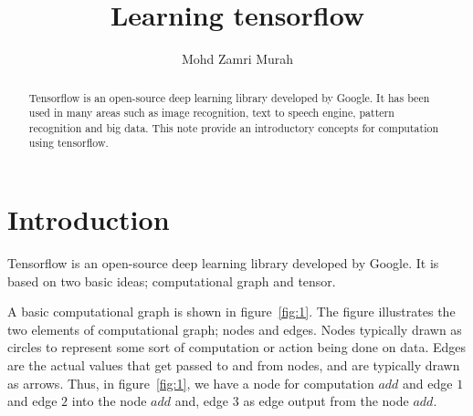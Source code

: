 \documentclass[vecarrow]{svproc}
\begin{document}
 
\mainmatter %

\title{Learning tensorflow} %

\author{Mohd Zamri Murah} %

\maketitle %

\begin{abstract} 

Tensorflow is an open-source
deep learning library developed by Google.
It has been used in many areas such as image recognition, text
to speech engine, pattern recognition and
big data. This note provide an introductory concepts for
computation using tensorflow. 


\end{abstract} %

\section{Introduction} 

Tensorflow is an open-source deep learning library
developed by Google\cite{abadi2015tensorflow}. It is based on
two basic ideas; computational graph and
tensor. 

A basic computational graph is shown in
figure~\ref{fig:1}. The figure illustrates the two
elements of computational graph; nodes and edges. Nodes
typically drawn as circles to represent some sort
of computation or action being done on data. Edges are the
actual values that get passed to and from
nodes, and are typically drawn as arrows. Thus, in
figure~\ref{fig:1}, we have a node for computation
$add$  and edge $1$ and edge $2$ into the node $add$ and,
edge $3$ as edge output from the node
$add$. 
\end{document}
